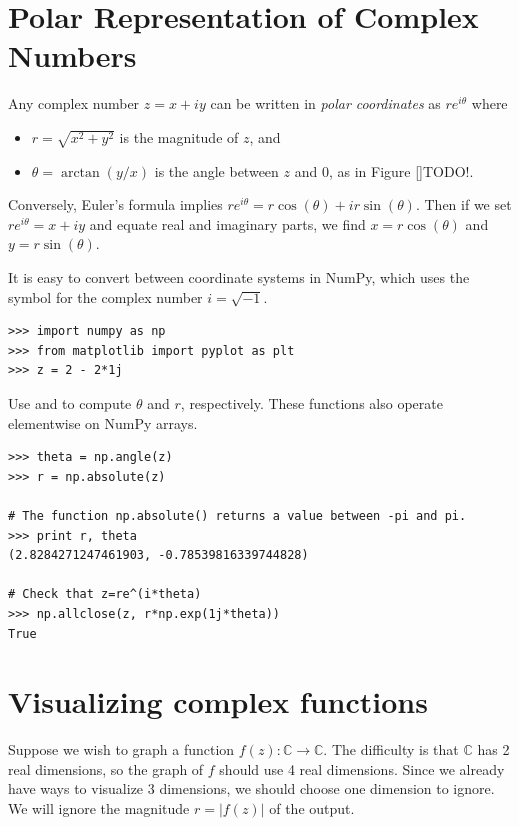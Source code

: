 \label{Lab:complex_intro}


\section*{Polar Representation of Complex Numbers}

Any complex number $z = x+iy$ can be written in \emph{polar coordinates} as $re^{i\theta}$ where
\begin{itemize}
\item $r=\sqrt{x^2+y^2}$ is the magnitude of $z$, and
\item $\theta = \arctan(y/x)$ is the angle between $z$ and 0, as in Figure \ref{}TODO!.
\end{itemize}
Conversely, Euler's formula implies $re^{i\theta} = r\cos(\theta) + ir\sin(\theta)$. Then if we set $re^{i\theta}=x+iy$ and equate real and imaginary parts, we find $x=r\cos(\theta)$ and $y=r\sin(\theta)$.

It is easy to convert between coordinate systems in NumPy, which uses the symbol  for the complex number $i=\sqrt{-1}$.
\begin{lstlisting}
>>> import numpy as np
>>> from matplotlib import pyplot as plt
>>> z = 2 - 2*1j
\end{lstlisting}
Use  and  to compute $\theta$ and $r$, respectively.
These functions also operate elementwise on NumPy arrays.
\begin{lstlisting}
>>> theta = np.angle(z)
>>> r = np.absolute(z)

# The function np.absolute() returns a value between -pi and pi.
>>> print r, theta
(2.8284271247461903, -0.78539816339744828)

# Check that z=re^(i*theta)
>>> np.allclose(z, r*np.exp(1j*theta))
True
\end{lstlisting}

\section*{Visualizing complex functions}
Suppose we wish to graph a function $f(z): \mathbb{C} \rightarrow \mathbb{C}$. 
The difficulty is that $\mathbb{C}$ has 2 real dimensions, so the graph of $f$ should use 4 real dimensions.
 Since we already have ways to visualize 3 dimensions, we should choose one dimension to ignore. 
 We will ignore the magnitude $r = |f(z)|$ of the output.

